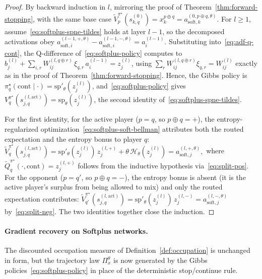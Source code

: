 \documentclass[twoside]{article}
\newcommand{\1}{\mathbf{1}}
\begin{document}
\begin{proof}
By backward induction in $l$, mirroring the proof of Theorem~\ref{thm:forward-stopping}, with the
same base case $\tilde V_p^{\pi^\star}(s_{k,q}^{(0)}) = x_k^{p\oplus q} = a_{\mathrm{soft},k}^{(0,
    p\oplus q, \theta)}$. For $l \ge 1$, assume~\eqref{eq:softplus-spne-tildes} holds at layer $l-1$,
so the decomposed activations obey $a_{\mathrm{soft},i}^{(l-1, +,\theta)} -
    a_{\mathrm{soft},i}^{(l-1, -,\theta)} = a_i^{(l-1)}$. Substituting into~\eqref{eq:adf-q-cont}, the
Q-difference of~\eqref{eq:softplus-policy} computes to
$b_j^{(l)} + \sum_{i,r} W_{ij}^{(l, q\oplus r)}\, \xi_{q,r}\, a_i^{(l-1)} = z_j^{(l)}$, using
$\sum_r W_{ij}^{(l, q\oplus r)}\xi_{q,r} = W_{ij}^{(l)}$ exactly as in the proof of
Theorem~\ref{thm:forward-stopping}. Hence, the Gibbs policy is $\pi_q^\star(\mathrm{cont}\mid
    \cdot) = \mathrm{sp}'_\theta(z_j^{(l)})$, and~\eqref{eq:softplus-policy} gives
$V_q^{\pi^\star}(s_{j,q}^{(l, \mathrm{act})}) = \mathrm{sp}_\theta(z_j^{(l)})$, the second identity
of~\eqref{eq:softplus-spne-tildes}.

For the first identity, for the active player ($p = q$, so $p \oplus q = +$), the
entropy-regularized optimization~\eqref{eq:softplus-soft-bellman} attributes both the routed
expectation and the entropy bonus to player $q$:
\(
    \tilde V_q^{\pi^\star}(s_{j,q}^{(l, \mathrm{act})})
    = \mathrm{sp}'_\theta(z_j^{(l)})\, z_j^{(l, +)} + \theta\, \mathcal{H}_\theta(z_j^{(l)})
    = a_{\mathrm{soft},j}^{(l, +, \theta)},
\)
where $\tilde Q_q^{\pi^\star}(\cdot, \mathrm{cont}) = z_j^{(l, +)}$ follows from the inductive
hypothesis via~\eqref{eq:split-pos}. For the opponent ($p = q'$, so $p \oplus q = -$), the entropy
bonus is absent (it is the active player's surplus from being allowed to mix) and only the routed
expectation contributes:
\(
    \tilde V_{q'}^{\pi^\star}(s_{j,q}^{(l, \mathrm{act})})
    = \mathrm{sp}'_\theta(z_j^{(l)})\, z_j^{(l, -)}
    = a_{\mathrm{soft},j}^{(l, -, \theta)}
\)
by~\eqref{eq:split-neg}. The two identities together close the induction.
\end{proof}

\paragraph{Gradient recovery on Softplus networks.}\label{app:softplus-gradient}
The discounted occupation measure of Definition~\ref{def:occupation} is unchanged in form, but the
trajectory law $\Pi_x^\theta$ is now generated by the Gibbs policies~\eqref{eq:softplus-policy} in
place of the deterministic stop/continue rule.
\end{document}
